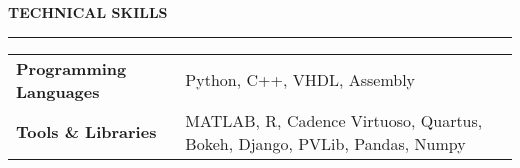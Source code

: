 \documentclass[10 pt]{article}%
\begin{document}
{{{{{{{{{{{\begin{flushleft}\bf{\large{TECHNICAL SKILLS}}\end{flushleft}
\vspace{-1.5mm}
\hrule
\vspace{-2mm}
\begin{center}
\begin{tabular}{m{4.5cm}   m{12.5cm}} 
	\vspace{0.1cm}
	\textbf{Programming Languages} & \vspace{0.1cm} Python, C++, VHDL, Assembly\\ 
	\textbf{Tools \& Libraries} & MATLAB, R, Cadence Virtuoso, Quartus, Bokeh, Django, PVLib, Pandas, Numpy \\  
\end{tabular}
\end{center}



}}}}}}}}}}}
\end{document}
